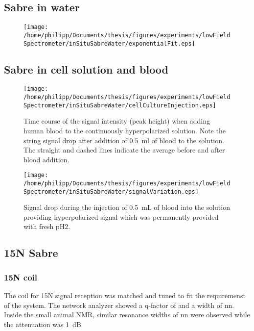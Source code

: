     \subsection{Sabre in water}
    \begin{figure}[h]
    \end{figure}
    \begin{figure}[h]
        \centering
        \texttt{[image: /home/philipp/Documents/thesis/figures/experiments/lowFieldSpectrometer/inSituSabreWater/exponentialFit.eps]}
    \end{figure}
    \subsection{Sabre in cell solution and blood}
    \begin{figure}[h]
        \texttt{[image: /home/philipp/Documents/thesis/figures/experiments/lowFieldSpectrometer/inSituSabreWater/cellCultureInjection.eps]}
        \caption[Cell culture solution addition to hyperpolarized signal]{Time course of the signal intensity (peak height) when adding human blood to the continuously hyperpolarized solution. Note the string signal drop after addition of \SI{0.5}{\milli\litre} of blood to the solution. The straight and dashed lines indicate the average before and after blood addition.}
        \label{chap:MaterialsAndMethods:bloodInjection}
    \end{figure}
    \begin{figure}[h]
        \texttt{[image: /home/philipp/Documents/thesis/figures/experiments/lowFieldSpectrometer/inSituSabreWater/signalVariation.eps]}
        \label{chap:MaterialsAndMethods:bloodInjection2}
        \caption[Blood addition to hyperpolarized signal]{Signal drop during the injection of \SI{0.5}{\milli\liter} of blood into the solution providing hyperpolarized signal which was permanently provided with fresh pH2.}
    \end{figure}
    \subsection{15N Sabre}
        \subsubsection{15N coil}
        The coil for 15N signal reception was matched and tuned to fit the requiremenst of the system. The network analyzer showed a q-factor of  and a width of nn. Inside the small animal NMR, similar resonance widths of nn were observed while the attenuation was \SI{1}{\deci\bel}
